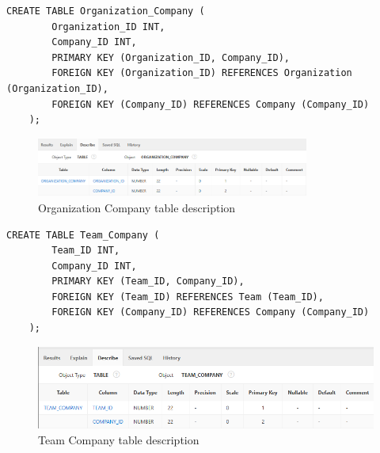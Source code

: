 \begin{lstlisting}[caption={Create Organization Company table}, label={lst:create_organization_company}]
    CREATE TABLE Organization_Company (
        Organization_ID INT,
        Company_ID INT,
        PRIMARY KEY (Organization_ID, Company_ID),
        FOREIGN KEY (Organization_ID) REFERENCES Organization (Organization_ID),
        FOREIGN KEY (Company_ID) REFERENCES Company (Company_ID)
    );
    \end{lstlisting}
\begin{figure}[H]
    \centering
    \includegraphics[width=0.8\textwidth]{images/TableDesc/ORGANIZATION_COMPANY.png}
    \caption{Organization Company table description}
    \label{fig:organization_company_table}
\end{figure}
\begin{lstlisting}[caption={Create Team Company table}, label={lst:create_team_company}]
    CREATE TABLE Team_Company (
        Team_ID INT,
        Company_ID INT,
        PRIMARY KEY (Team_ID, Company_ID),
        FOREIGN KEY (Team_ID) REFERENCES Team (Team_ID),
        FOREIGN KEY (Company_ID) REFERENCES Company (Company_ID)
    );
    \end{lstlisting}
\begin{figure}[H]
    \centering
    \includegraphics[width=1\textwidth]{images/TableDesc/TEAM_COMPANY.png}
    \caption{Team Company table description}
    \label{fig:team_company_table}
\end{figure}
\clearpage
